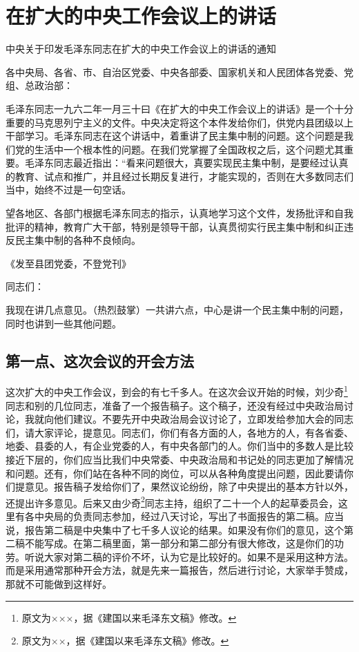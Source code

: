 \section[在扩大的中央工作会议上的讲话（一九六二年一月三十日）]{在扩大的中央工作会议上的讲话}

\begin{yinyong}
{\noindent\Large\centering 中央关于印发毛泽东同志在扩大的中央工作会议上的讲话的通知 \par}

各中央局、各省、市、自治区党委、中央各部委、国家机关和人民团体各党委、党组、总政治部：

毛泽东同志一九六二年一月三十曰《在扩大的中央工作会议上的讲话》是一个十分重要的马克思列宁主义的文件。中央决定将这个本件发给你们，供党内县团级以上干部学习。毛泽东同志在这个讲话中，着重讲了民主集中制的问题。这个问题是我们党的生活中一个根本性的问题。在我们党掌握了全国政权之后，这个问题尤其重要。毛泽东同志最近指出：“看来问题很大，真要实现民主集中制，是要经过认真的教育、试点和推广，并且经过长期反复进行，才能实现的，否则在大多数同志们当中，始终不过是一句空话。

望各地区、各部门根据毛泽东同志的指示，认真地学习这个文件，发扬批评和自我批评的精神，教育广大干部，特别是领导干部，认真贯彻实行民主集中制和纠正违反民主集中制的各种不良倾向。

《发至县团党委，不登党刊》


\end{yinyong}

{\noindent 同志们：}

我现在讲几点意见。（热烈鼓掌）一共讲六点，中心是讲一个民主集中制的问题，同时也讲到一些其他问题。

\subsection{第一点、这次会议的开会方法}

这次扩大的中央工作会议，到会的有七千多人。在这次会议开始的时候，刘少奇\footnote{原文为×××，据《建国以来毛泽东文稿》修改。}同志和别的几位同志，准备了一个报告稿子。这个稿子，还没有经过中央政治局讨论，我就向他们建议。不要先开中央政治局会议讨论了，立即发给参加大会的同志们，请大家评论，提意见。同志们，你们有各方面的人，各地方的人，有各省委、地委、县委的人，有企业党委的人，有中央各部门的人。你们当中的多数人是比较接近下层的，你们应当比我们中央常委、中央政治局和书记处的同志更加了解情况和问题。还有，你们站在各种不同的岗位，可以从各种角度提出问题，因此要请你们提意见。报告稿子发给你们了，果然议论纷纷，除了中央提出的基本方针以外，还提出许多意见。后来又由少奇\footnote{原文为××，据《建国以来毛泽东文稿》修改。}同志主持，组织了二十一个人的起草委员会，这里有各中央局的负责同志参加，经过八天讨论，写出了书面报告的第二稿。应当说，报告第二稿是中央集中了七千多人议论的结果。如果没有你们的意见，这个第二稿不能写成。在第二稿里面，第一部分和第二部分有很大修改，这是你们的功劳。听说大家对第二稿的评价不坏，认为它是比较好的。如果不是采用这种方法。而是采用通常那种开会方法，就是先来一篇报告，然后进行讨论，大家举手赞成，那就不可能做到这样好。


